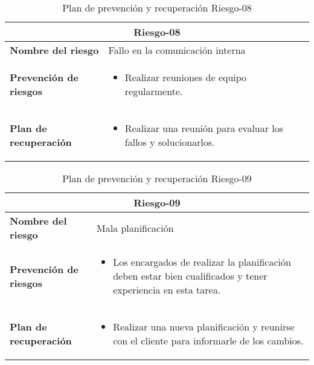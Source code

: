 \begin{table}[H]
\begin{center}
\begin{tabular}{p{} p{10cm}}
\multicolumn{2}{c}{\textbf{Riesgo-08} } \\
\hline \hline
\textbf{Nombre del riesgo} & Fallo en la comunicación interna \\
\hline
\textbf{Prevención de riesgos} & \begin{itemize}[-]
  \item Realizar reuniones de equipo regularmente.
  \end{itemize} \\
\hline
\textbf{Plan de recuperación} &   \begin{itemize}[-]
  \item Realizar una reunión para evaluar los fallos y solucionarlos.
  \end{itemize}\\
\hline
\end{tabular}
\caption{Plan de prevención y recuperación Riesgo-08}
\label{tab:Riesgo-08-Prev_Recup}
\end{center}
\end{table}

\begin{table}[H]
\begin{center}
\begin{tabular}{p{} p{10cm}}
\multicolumn{2}{c}{\textbf{Riesgo-09} } \\
\hline \hline
\textbf{Nombre del riesgo} & Mala planificación \\
\hline
\textbf{Prevención de riesgos} & \begin{itemize}[-]
  \item Los encargados de realizar la planificación deben estar bien cualificados y tener experiencia en esta tarea.
  \end{itemize} \\
\hline
\textbf{Plan de recuperación} &   \begin{itemize}[-]
  \item Realizar una nueva planificación y reunirse con el cliente para informarle de los cambios.
  \end{itemize}\\
\hline
\end{tabular}
\caption{Plan de prevención y recuperación Riesgo-09}
\label{tab:Riesgo-09-Prev_Recup}
\end{center}
\end{table}

